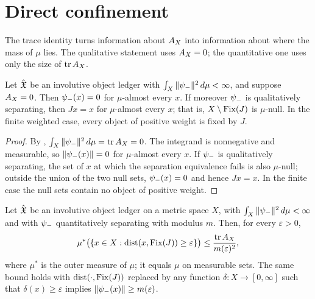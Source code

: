 \section{Direct confinement}
\label{sec:direct_confinement}

The trace identity turns information about \(A_{X}\) into information
about where the mass of \(\mu\) lies.  The qualitative statement uses
\(A_{X}=0\); the quantitative one uses only the size of \(\operatorname{tr}A_{X}\).

\begin{theorem}
\label{thm:duality_confinement:separation-confinement}
Let \(\hat{\mathfrak{X}}\) be an involutive object ledger with
\(\int_X\|\psi_{-}\|^2\,d\mu<\infty\), and suppose \(A_{X}=0\).  Then
\(\psi_{-}(x)=0\) for \(\mu\)-almost every \(x\).  If moreover \(\psi_{-}\)
is qualitatively separating, then \(Jx=x\) for \(\mu\)-almost every
\(x\); that is, \(X\setminus\operatorname{Fix}(J)\) is \(\mu\)-null.  In the finite
weighted case, every object of positive weight is fixed by \(J\).
\end{theorem}

\begin{proof}
By ,
\(\int_X\|\psi_{-}\|^2\,d\mu=\operatorname{tr}A_{X}=0\).  The integrand is nonnegative
and measurable, so \(\|\psi_{-}(x)\|=0\) for \(\mu\)-almost every \(x\).
If \(\psi_{-}\) is qualitatively separating, the set of \(x\) at which the
separation equivalence fails is also \(\mu\)-null; outside the union of
the two null sets, \(\psi_{-}(x)=0\) and hence \(Jx=x\).  In the finite
case the null sets contain no object of positive weight.
\end{proof}

\begin{theorem}
\label{thm:duality_confinement:quantitative-confinement}
Let \(\hat{\mathfrak{X}}\) be an involutive object ledger on a metric space \(X\),
with \(\int_X\|\psi_{-}\|^2\,d\mu<\infty\) and with \(\psi_{-}\)
quantitatively separating with modulus \(m\).  Then, for every
\(\varepsilon>0\),
\[
  \mu^*\bigl(\{x\in X:\operatorname{dist}(x,\operatorname{Fix}(J))\geq\varepsilon\}\bigr)
  \leq
  \frac{\operatorname{tr}A_{X}}{m(\varepsilon)^2},
\]
where \(\mu^*\) is the outer measure of \(\mu\); it equals \(\mu\) on
measurable sets.  The same bound holds with \(\operatorname{dist}(\cdot,\operatorname{Fix}(J))\)
replaced by any function \(\delta:X\to[0,\infty]\) such that
\(\delta(x)\geq\varepsilon\) implies \(\|\psi_{-}(x)\|\geq m(\varepsilon)\).
\end{theorem}

